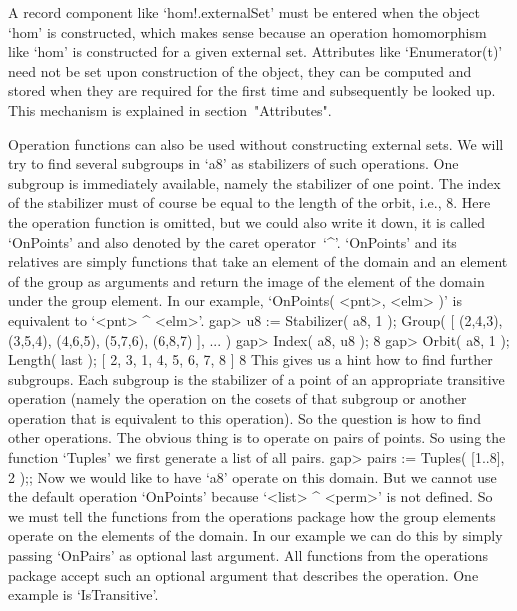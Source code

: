 \answer  A record component  like `hom!.externalSet' must be entered when
the object `hom'  is constructed, which makes  sense because an operation
homomorphism   like  `hom' is  constructed for     a given external  set.
Attributes like `Enumerator(t)' need not  be set upon construction of the
object, they can be computed  and stored when  they are required for  the
first time and subsequently be looked up. This  mechanism is explained in
section~"Attributes".


Operation functions can also be used  without constructing external sets.
We will  try to find  several  subgroups in `a8'   as stabilizers of such
operations. One subgroup  is immediately available, namely the stabilizer
of one point. The index of the stabilizer must  of course be equal to the
length of the orbit, i.e., 8. Here the operation function is omitted, but
we could also write it down, it is called  `OnPoints' and also denoted by
the caret operator~`^'. `OnPoints' and its relatives are simply functions
that  take an  element of  the  domain  and an  element  of the  group as
arguments  and return the  image of the element   of the domain under the
group element. In  our example, `OnPoints(  <pnt>, <elm> )' is equivalent
to `<pnt> ^ <elm>'.
\beginexample
    gap> u8 := Stabilizer( a8, 1 );
    Group( [ (2,4,3), (3,5,4), (4,6,5), (5,7,6), (6,8,7) ], ... )
    gap> Index( a8, u8 );
    8
    gap> Orbit( a8, 1 ); Length( last );
    [ 2, 3, 1, 4, 5, 6, 7, 8 ]
    8
\endexample
This gives us a hint how to find further  subgroups. Each subgroup is the
stabilizer of a point of an appropriate  transitive operation (namely the
operation  on  the cosets of that  subgroup  or another operation that is
equivalent to  this operation).  So the question   is how  to find  other
operations. The obvious thing is to operate  on pairs of points. So using
the function `Tuples' we first generate a list of all pairs.
\beginexample
    gap> pairs := Tuples( [1..8], 2 );;
\endexample
Now we would like to have `a8' operate on this  domain. But we cannot use
the  default operation `OnPoints'  because    `<list> ^ <perm>' is    not
defined. So we  must tell the functions  from the operations package  how
the group elements operate on the elements of  the domain. In our example
we can do this by simply passing `OnPairs' as optional last argument. All
functions  from the operations package  accept  such an optional argument
that describes the operation. One example is `IsTransitive'.
